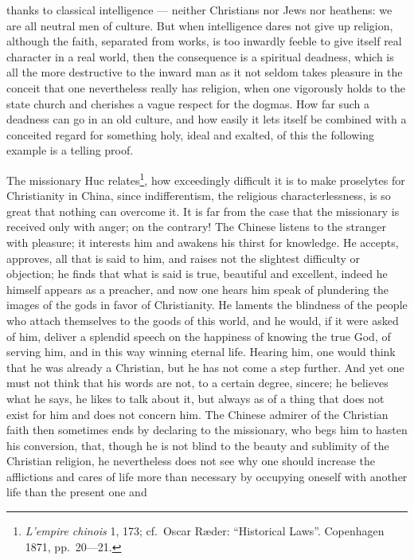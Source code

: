 \documentclass[12pt,a4paper,openany]{book}
\newcommand{\opage}[1]{\marginnote{\footnotesize\textit{[#1]}}}
\begin{document}
thanks to classical intelligence --- neither Christians nor
Jews nor heathens: we are all neutral men of culture.
But when intelligence dares not give up religion, although
the faith, separated from works, is too inwardly feeble to
give itself real character in a real world, then the
consequence is a spiritual deadness, which is all the more
destructive to the inward man as it not
seldom takes pleasure in the conceit that one nevertheless
really has religion, when one vigorously holds to the state church
and cherishes a vague respect for the dogmas. How far
such a deadness can go in an old culture,
and how easily it lets itself be combined with a conceited regard
for something holy, ideal and exalted, of this the following
example is a telling proof.

The missionary Huc relates\footnote[1]{\textit{L'empire chinois} 1, 173; cf.\ Oscar Ræder: ``Historical Laws''. Copenhagen 1871, pp.\ 20---21.}, how exceedingly difficult
it is to make proselytes for Christianity in
China, since indifferentism, the religious characterlessness,
is so great that nothing can overcome it. It is far
from the case that the missionary is received only with anger; on the contrary!
The Chinese listens to the stranger with pleasure; it
interests him and awakens his thirst for knowledge. He
\setcounter{footnote}{0}%
\opage{503}accepts, approves, all that is said to him, and raises not the
slightest difficulty or objection; he finds that what is said is true,
beautiful and excellent, indeed he himself appears as a preacher, and now one hears him speak
of plundering the images of the gods in favor of Christianity.
He laments the blindness of the people who
attach themselves to the goods of this world, and he would, if
it were asked of him, deliver a splendid speech on the happiness of
knowing the true God, of serving him, and in this way
winning eternal life. Hearing him, one would
think that he was already a Christian, but he has not come
a step further. And yet one must not think that
his words are not, to a certain degree, sincere; he
believes what he says, he likes to talk about it, but always
as of a thing that does not exist for him and does not
concern him. The Chinese admirer of the Christian
faith then sometimes ends by declaring to the missionary, who
begs him to hasten his conversion, that, though he
is not blind to the beauty and sublimity of the Christian religion,
he nevertheless does not see why one should increase the
afflictions and cares of life more than necessary by occupying
oneself with another life than the present one and
\end{document}
